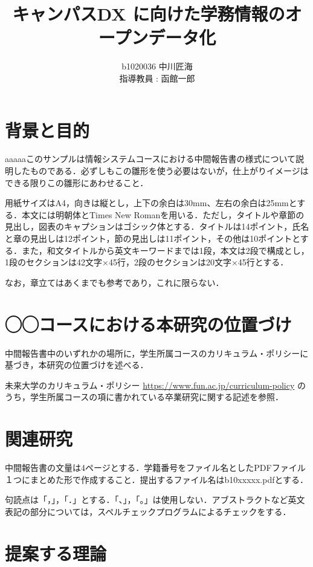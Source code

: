 \documentclass[11pt]{bxjsarticle}
\author{%
b1020036 中川匠海\\指導教員 : 函館一郎
}
\title{キャンパスDX に向けた学務情報のオープンデータ化}
\begin{document}
\maketitle

\section{背景と目的}

aaaaaこのサンプルは情報システムコースにおける中間報告書の様式について説明したものである．必ずしもこの雛形を使う必要はないが，仕上がりイメージはできる限りこの雛形にあわせること．

用紙サイズはA4，向きは縦とし，上下の余白は30mm、左右の余白は25mmとする．本文には明朝体とTimes New Romanを用いる．ただし，タイトルや章節の見出し，図表のキャプションはゴシック体とする．タイトルは14ポイント，氏名と章の見出しは12ポイント，節の見出しは11ポイント，その他は10ポイントとする．また，和文タイトルから英文キーワードまでは1段，本文は2段で構成とし，1段のセクションは42文字×45行，2段のセクションは20文字×45行とする．

なお，章立てはあくまでも参考であり，これに限らない．

\section{◯◯コースにおける本研究の位置づけ}
中間報告書中のいずれかの場所に，学生所属コースのカリキュラム・ポリシーに基づき，本研究の位置づけを述べる．

未来大学のカリキュラム・ポリシー
\url{https://www.fun.ac.jp/curriculum-policy} のうち，学生所属コースの項に書かれている卒業研究に関する記述を参照．

\section{関連研究}

中間報告書の文量は4ページとする．学籍番号をファイル名としたPDFファイル１つにまとめた形で作成すること．提出するファイル名はb10xxxxx.pdfとする．

句読点は「，」，「．」とする．「、」，「。」は使用しない．アブストラクトなど英文表記の部分については，スペルチェックプログラムによるチェックをする．

\section{提案する理論}
\end{document}
